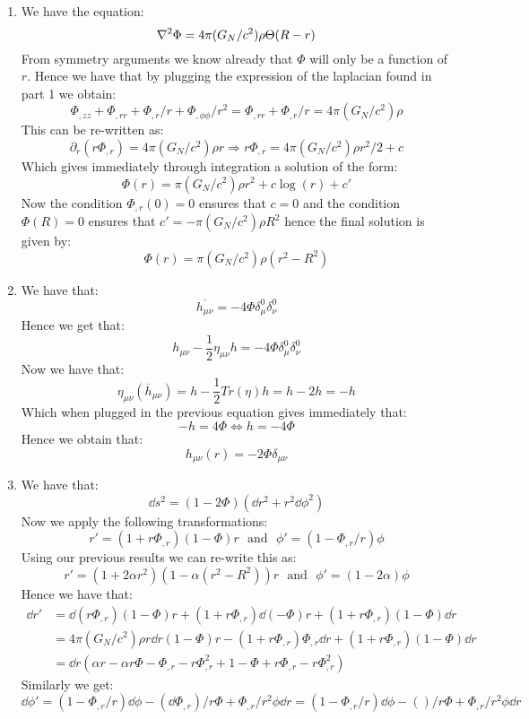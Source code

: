 \documentclass[10pt,a4paper]{article}
\begin{document}
\begin{enumerate}

\item We have the equation:
\[
\laplacian \Phi = 4\pi (G_N/c^2) \rho \Theta(R - r)
\]
From symmetry arguments we know already that $\Phi$ will only be a function of $r$. Hence we have that by plugging the expression of the laplacian found in part 1 we obtain:
\[
\Phi_{,zz} + \Phi_{,rr} + \Phi_{,r}/r + \Phi_{,\phi\phi}/r^2 = \Phi_{,rr} + \Phi_{,r}/r =  4 \pi (G_N/c^2) \rho
\]
This can be re-written as:
\[
\partial_r(r \Phi_{,r}) = 4 \pi (G_N /c^2)\rho r \Rightarrow r \Phi_{,r} = 4\pi (G_N/c^2) \rho r^{2}/2 + c
\]
Which gives immediately through integration a solution of the form:
\[
\Phi(r) = \pi (G_N/c^2) \rho r^2  + c \log(r) + c'
\]
Now the condition $\Phi_{,r}(0) = 0$ ensures that $c = 0$ and the condition $\Phi(R) = 0$ ensures that $c' = - \pi (G_N/c^2) \rho R^2$ hence the final solution is given by:
\[
\Phi(r) = \pi(G_N/c^2)\rho(r^2 - R^2)
\]

\item We have that:
\[
\overline{h_{\mu \nu}} = -4 \Phi \delta^0_\mu \delta^0_\nu
\]
Hence we get that:
\[
h_{\mu \nu} - \frac{1}{2} \eta_{\mu \nu} h = - 4 \Phi \delta^0_\mu \delta^0_\nu
\]
Now we have that:
\[
\eta_{\mu\nu}(\overline{h}_{\mu\nu}) = h - \frac{1}{2} Tr(\eta) h = h - 2h = - h
\]
Which when plugged in the previous equation gives immediately that:
\[
-h = 4 \Phi \Leftrightarrow h = -4 \Phi
\]
Hence we obtain that:
\[
h_{\mu \nu}(r) = - 2 \Phi \delta_{\mu \nu}
\]


\item We have that:
\[
\dd s^2 = (1 - 2 \Phi) (\dd r^2 + r^2 \dd \phi^2)
\]
Now we apply the following transformations:
\[
r' = (1 + r \Phi_{,r})(1 - \Phi) r  \mbox{~~and~~} \phi' = (1 - \Phi_{,r}/r)\phi
\]
Using our previous results we can re-write this as:
\[
r' = (1 + 2\alpha r^2)(1 - \alpha(r^2 - R^2)) r \mbox{~~and~~} \phi' = (1 - 2\alpha) \phi 
\]
Hence we have that:
\begin{align*}
\dd r' &= \dd (r \Phi_{,r}) (1 - \Phi) r + (1 + r \Phi_{,r}) \dd(-\Phi) r + (1 + r \Phi_{,r})(1 - \Phi)\dd r\\
&= 4\pi(G_N/c^2)\rho r \dd r (1 - \Phi) r - (1 + r \Phi_{,r}) \Phi_{,r} \dd r + (1 + r \Phi_{,r})(1 - \Phi)\dd r \\
&= \dd r \left( \alpha r - \alpha r \Phi - \Phi_{,r} - r \Phi_{,r}^2 + 1 - \Phi + r \Phi_{,r} - r \Phi_{,r}^2 \right)
\end{align*}
Similarly we get:
\[
\dd \phi' = (1 - \Phi_{,r}/r)\dd \phi - (\dd \Phi_{,r})/r \Phi + \Phi_{,r}/r^2 \phi \dd r = (1 - \Phi_{,r}/r)\dd \phi - ()/r \Phi + \Phi_{,r}/r^2 \phi \dd r
\]


\end{enumerate}
\end{document}
